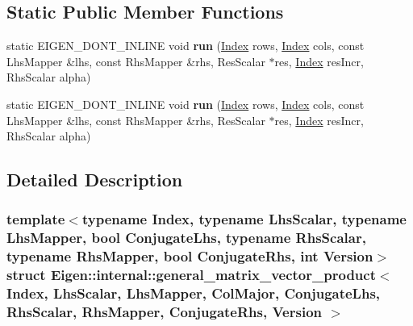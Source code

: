 \subsection*{Static Public Member Functions}
\begin{DoxyCompactItemize}
\item 
\mbox{\label{struct_eigen_1_1internal_1_1general__matrix__vector__product_3_01_index_00_01_lhs_scalar_00_01_l2767aff966c7bf3a7d425c9d340a95e8_a8b2829241d86c85f39e2c559d9e77507}} 
static E\+I\+G\+E\+N\+\_\+\+D\+O\+N\+T\+\_\+\+I\+N\+L\+I\+NE void {\bfseries run} (\hyperlink{namespace_eigen_a62e77e0933482dafde8fe197d9a2cfde}{Index} rows, \hyperlink{namespace_eigen_a62e77e0933482dafde8fe197d9a2cfde}{Index} cols, const Lhs\+Mapper \&lhs, const Rhs\+Mapper \&rhs, Res\+Scalar $\ast$res, \hyperlink{namespace_eigen_a62e77e0933482dafde8fe197d9a2cfde}{Index} res\+Incr, Rhs\+Scalar alpha)
\item 
\mbox{\label{struct_eigen_1_1internal_1_1general__matrix__vector__product_3_01_index_00_01_lhs_scalar_00_01_l2767aff966c7bf3a7d425c9d340a95e8_ad6a13e19012c7bce6857a037b139d362}} 
static E\+I\+G\+E\+N\+\_\+\+D\+O\+N\+T\+\_\+\+I\+N\+L\+I\+NE void {\bfseries run} (\hyperlink{namespace_eigen_a62e77e0933482dafde8fe197d9a2cfde}{Index} rows, \hyperlink{namespace_eigen_a62e77e0933482dafde8fe197d9a2cfde}{Index} cols, const Lhs\+Mapper \&lhs, const Rhs\+Mapper \&rhs, Res\+Scalar $\ast$res, \hyperlink{namespace_eigen_a62e77e0933482dafde8fe197d9a2cfde}{Index} res\+Incr, Rhs\+Scalar alpha)
\end{DoxyCompactItemize}


\subsection{Detailed Description}
\subsubsection*{template$<$typename Index, typename Lhs\+Scalar, typename Lhs\+Mapper, bool Conjugate\+Lhs, typename Rhs\+Scalar, typename Rhs\+Mapper, bool Conjugate\+Rhs, int Version$>$\newline
struct Eigen\+::internal\+::general\+\_\+matrix\+\_\+vector\+\_\+product$<$ Index, Lhs\+Scalar, Lhs\+Mapper, Col\+Major, Conjugate\+Lhs, Rhs\+Scalar, Rhs\+Mapper, Conjugate\+Rhs, Version $>$}



